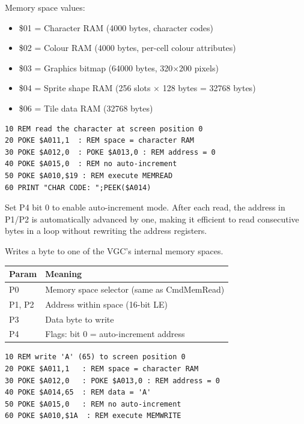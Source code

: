 Memory space values:
\begin{itemize}
  \item \$01 = Character RAM (4000 bytes, character codes)
  \item \$02 = Colour RAM (4000 bytes, per-cell colour attributes)
  \item \$03 = Graphics bitmap (64000 bytes, 320$\times$200 pixels)
  \item \$04 = Sprite shape RAM (256 slots $\times$ 128 bytes = 32768 bytes)
  \item \$06 = Tile data RAM (32768 bytes)
\end{itemize}

\begin{lstlisting}
10 REM read the character at screen position 0
20 POKE $A011,1  : REM space = character RAM
30 POKE $A012,0  : POKE $A013,0 : REM address = 0
40 POKE $A015,0  : REM no auto-increment
50 POKE $A010,$19 : REM execute MEMREAD
60 PRINT "CHAR CODE: ";PEEK($A014)
\end{lstlisting}

\begin{tipbox}
Set P4 bit 0 to enable auto-increment mode.  After each read, the address in
P1/P2 is automatically advanced by one, making it efficient to read
consecutive bytes in a loop without rewriting the address registers.
\end{tipbox}



Writes a byte to one of the VGC's internal memory spaces.

\begin{center}
\small
\begin{tabular}{@{}ll@{}}
\toprule
\textbf{Param} & \textbf{Meaning} \\
\midrule
P0     & Memory space selector (same as CmdMemRead) \\
P1, P2 & Address within space (16-bit LE) \\
P3     & Data byte to write \\
P4     & Flags: bit 0 = auto-increment address \\
\bottomrule
\end{tabular}
\end{center}

\begin{lstlisting}
10 REM write 'A' (65) to screen position 0
20 POKE $A011,1   : REM space = character RAM
30 POKE $A012,0   : POKE $A013,0 : REM address = 0
40 POKE $A014,65  : REM data = 'A'
50 POKE $A015,0   : REM no auto-increment
60 POKE $A010,$1A  : REM execute MEMWRITE
\end{lstlisting}


